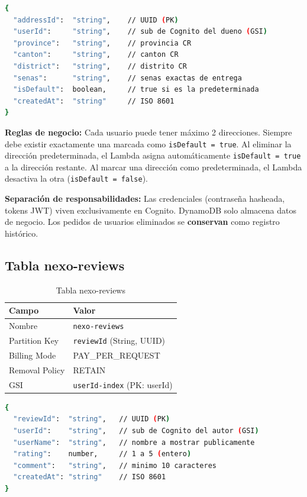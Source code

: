 \documentclass[12pt,a4paper]{article}
\begin{document}
\begin{lstlisting}[language=bash, caption={Esquema de ítem en nexo-addresses}]
{
  "addressId":  "string",    // UUID (PK)
  "userId":     "string",    // sub de Cognito del dueno (GSI)
  "province":   "string",    // provincia CR
  "canton":     "string",    // canton CR
  "district":   "string",    // distrito CR
  "senas":      "string",    // senas exactas de entrega
  "isDefault":  boolean,     // true si es la predeterminada
  "createdAt":  "string"     // ISO 8601
}
\end{lstlisting}

\begin{nexobox}
\textbf{Reglas de negocio:} Cada usuario puede tener máximo 2 direcciones. Siempre
debe existir exactamente una marcada como \texttt{isDefault = true}. Al eliminar la
dirección predeterminada, el Lambda asigna automáticamente \texttt{isDefault = true}
a la dirección restante. Al marcar una dirección como predeterminada, el Lambda
desactiva la otra (\texttt{isDefault = false}).
\end{nexobox}

\begin{nexobox}
\textbf{Separación de responsabilidades:} Las credenciales (contraseña hasheada,
tokens JWT) viven exclusivamente en Cognito. DynamoDB solo almacena datos de negocio.
Los pedidos de usuarios eliminados se \textbf{conservan} como registro histórico.
\end{nexobox}

\subsection{Tabla nexo-reviews}

\begin{table}[H]
\centering
\begin{tabular}{@{}ll@{}}
\toprule
\textbf{Campo} & \textbf{Valor} \\
\midrule
Nombre & \texttt{nexo-reviews} \\
Partition Key & \texttt{reviewId} (String, UUID) \\
Billing Mode & PAY\_PER\_REQUEST \\
Removal Policy & RETAIN \\
GSI & \texttt{userId-index} (PK: userId) \\
\bottomrule
\end{tabular}
\caption{Tabla nexo-reviews}
\end{table}

\begin{lstlisting}[language=bash, caption={Esquema de ítem en nexo-reviews}]
{
  "reviewId":  "string",   // UUID (PK)
  "userId":    "string",   // sub de Cognito del autor (GSI)
  "userName":  "string",   // nombre a mostrar publicamente
  "rating":    number,     // 1 a 5 (entero)
  "comment":   "string",   // minimo 10 caracteres
  "createdAt": "string"    // ISO 8601
}
\end{lstlisting}
\end{document}
